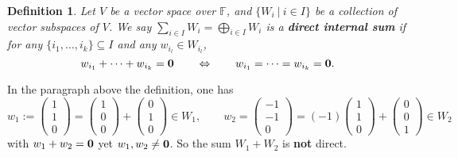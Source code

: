 \documentclass[12pt]{amsbook}
\newtheorem{definition}[theorem]{Definition}
\begin{document}
\begin{definition}
    Let $V$ be a vector space over $\mathbb{F}$, and $\{W_i\ |\ i \in I\}$ be a collection of vector subspaces of $V$. We say
    $\sum_{i \in I} W_i = \bigoplus_{i \in I} W_i$ is a {\bf direct internal sum} if for any $\{i_1, \dots, i_k\} \subseteq I$ and any $w_{i_l} \in W_{i_l}$, 
    $$w_{i_1} + \dots + w_{i_k} = {\bf 0} \quad \quad \Leftrightarrow \quad \quad w_{i_1} = \dots = w_{i_k} = {\bf 0}.$$
\end{definition}
In the paragraph above the definition, one has 
$$w_1 := \begin{pmatrix} 1\\ 1\\0 \end{pmatrix} = \begin{pmatrix} 1\\ 0\\0 \end{pmatrix} + \begin{pmatrix} 0\\ 1\\0 \end{pmatrix} \in W_1, \quad \quad w_2 = \begin{pmatrix} -1\\ -1\\0 \end{pmatrix} = (-1)\begin{pmatrix} 1\\ 1\\0 \end{pmatrix} + \begin{pmatrix} 0\\ 0\\1 \end{pmatrix} \in W_2$$ 
with $w_1 + w_2 = {\bf 0}$ yet $w_1, w_2 \neq {\bf 0}$. So the sum $W_1 + W_2$ is {\bf not} direct.
\end{document}
